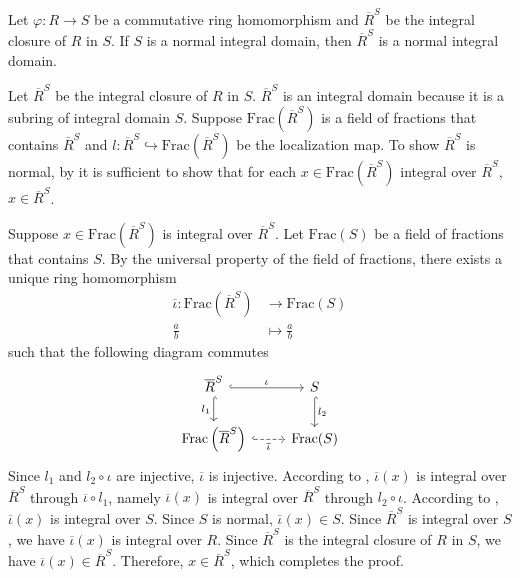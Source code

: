\begin{proposition}{}{}
    Let $\varphi: R\to S$ be a commutative ring homomorphism and $\overline{R}^S$ be the integral closure of $R$ in $S$. If $S$ is a normal integral domain, then $\overline{R}^S$ is a normal integral domain.
\end{proposition}
\begin{prf}
    Let $\overline{R}^S$ be the integral closure of $R$ in $S$. $\overline{R}^S$ is an integral domain because it is a subring of integral domain $S$. Suppose $\mathrm{Frac}\left(\overline{R}^S\right)$ is a field of fractions that contains $\overline{R}^S$ and $l:\overline{R}^S\hookrightarrow \mathrm{Frac}\left(\overline{R}^S\right)$ be the localization map. To show $\overline{R}^S$ is normal, by  it is sufficient to show that for each $x\in \mathrm{Frac}\left(\overline{R}^S\right)$ integral over $\overline{R}^S$, $x\in \overline{R}^S$. 
    
    Suppose $x\in \mathrm{Frac}\left(\overline{R}^S\right)$ is integral over $\overline{R}^S$. Let $\mathrm{Frac}\left(S\right)$ be a field of fractions that contains $S$. By the universal property of the field of fractions, there exists a unique ring homomorphism
    \begin{align*}
        \overline{\iota}:\mathrm{Frac}\left(\overline{R}^S\right)&\longrightarrow \mathrm{Frac}\left(S\right)\\
        \frac{a}{b}&\longmapsto \frac{a}{b}
    \end{align*}
    such that the following diagram commutes
    \[
        \begin{tikzcd}
            \overline{R}^S \arrow[r, "\iota", hook] \arrow[d, "l_1"', hook]                       & S \arrow[d, "l_2", hook] \\
            \mathrm{Frac}\left(\overline{R}^S\right) \arrow[r, "\overline{\iota}"', dashed, hook] & \mathrm{Frac}(S)        
            \end{tikzcd}
    \]
   Since $l_1$ and $l_2\circ \iota$ are injective, $\overline{\iota}$ is injective. According to , $\overline{\iota}(x)$ is integral over $\overline{R}^S$ through $\overline{\iota}\circ l_1$, namely  $\overline{\iota}(x)$ is integral over $\overline{R}^S$ through $l_2\circ \iota$. According to , $\overline{\iota}(x)$ is integral over $S$. Since $S$ is normal, $\overline{\iota}(x)\in S$. Since $\overline{R}^S$ is integral over $S$, we have $\overline{\iota}(x)$ is integral over $R$. Since $\overline{R}^S$ is the integral closure of $R$ in $S$, we have $\overline{\iota}(x)\in \overline{R}^S$. Therefore, $x\in \overline{R}^S$, which completes the proof.
\end{prf}

